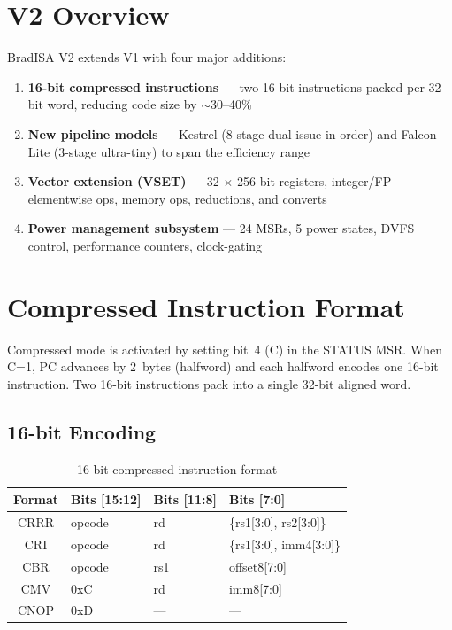 \documentclass[11pt,a4paper]{article}
\begin{document}
\newpage

\section{V2 Overview}

BradISA V2 extends V1 with four major additions:
\begin{enumerate}[nosep]
  \item \textbf{16-bit compressed instructions} --- two 16-bit instructions
        packed per 32-bit word, reducing code size by $\sim$30--40\%
  \item \textbf{New pipeline models} --- Kestrel (8-stage dual-issue in-order)
        and Falcon-Lite (3-stage ultra-tiny) to span the efficiency range
  \item \textbf{Vector extension (VSET)} --- 32 $\times$ 256-bit registers,
        integer/FP elementwise ops, memory ops, reductions, and converts
  \item \textbf{Power management subsystem} --- 24 MSRs, 5 power states,
        DVFS control, performance counters, clock-gating
\end{enumerate}

\newpage

\section{Compressed Instruction Format}

Compressed mode is activated by setting bit~4 (C) in the STATUS MSR.
When C=1, PC advances by 2~bytes (halfword) and each halfword encodes one
16-bit instruction. Two 16-bit instructions pack into a single 32-bit
aligned word.

\subsection{16-bit Encoding}

\begin{table}[H]
\centering
\caption{16-bit compressed instruction format}
\begin{tabular}{clll}
\toprule
Format & Bits [15:12] & Bits [11:8] & Bits [7:0] \\
\midrule
CRRR & opcode & rd & \{rs1[3:0], rs2[3:0]\} \\
CRI  & opcode & rd & \{rs1[3:0], imm4[3:0]\} \\
CBR  & opcode & rs1 & offset8[7:0] \\
CMV  & 0xC    & rd  & imm8[7:0] \\
CNOP & 0xD    & --- & --- \\
\bottomrule
\end{tabular}
\end{table}
\end{document}
